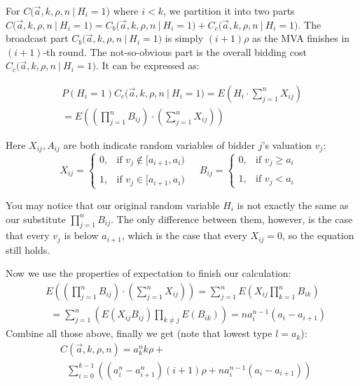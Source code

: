 For $C\big(\vec a, k, \rho, n ~\big|~ H_i = 1\big)$ where $i < k$, we partition
it into two parts $C\big(\vec a, k, \rho, n ~\big|~ H_i = 1\big) = C_b\big(\vec
a, k, \rho, n ~\big|~ H_i = 1\big) + C_c\big(\vec a, k, \rho, n ~\big|~ H_i =
1\big)$. The broadcast part $C_b\big(\vec a, k, \rho, n ~\big|~ H_i = 1 \big)$
is simply $(i+1)\rho$ as the MVA finishes in $(i+1)$-th round. The
not-so-obvious part is the overall bidding cost $C_c\big(\vec a, k, \rho, n
~\big|~ H_i = 1 \big)$. It can be expressed as:

\begin{align*}
P(H_i = 1)C_c\big(\vec a, k, \rho, n ~\big|~ H_i = 1 \big) = E\left( H_i \cdot
    \sum_{j=1}^n X_{ij}\right) \\
= E\left( \left( \prod_{j=1}^n B_{ij} \right) \cdot \left(\sum_{j=1}^n X_{ij}
    \right) \right)
\end{align*}

Here $X_{ij}, A_{ij}$ are both indicate random variables of bidder $j$'s valuation $v_j$:
$$
X_{ij} = \begin{cases}
    0, &\mbox{if $v_j \notin [a_{i+1}, a_{i})$ } \\\\
    1, &\mbox{if $v_j \in [a_{i+1}, a_{i})$}
\end{cases}
~~
B_{ij} = \begin{cases}
    0, &\mbox{if $v_j \geq a_{i}$ } \\\\
    1, &\mbox{if $v_j < a_{i}$}
\end{cases}
$$

You may notice that our original random variable $H_i$ is not exactly the same
as our substitute $\prod_{j=1}^n B_{ij}$. The only difference between them,
however, is the case that every $v_j$ is below $a_{i+1}$, which is the case
that every $X_{ij} = 0$, so the equation still holds.

Now we use the properties of expectation to finish our calculation:
\begin{align*}
  &E\left( \left( \prod_{j=1}^n B_{ij} \right) \cdot \left(\sum_{j=1}^n X_{ij}
  \right) \right) = \sum_{j=1}^n E\left( X_{ij} \prod_{k=1}^nB_{ik} \right)
  \\
    &~~ = \sum_{j=1}^n \left( E(X_{ij} B_{ij}) \prod_{k \neq j} E(B_{ik})
    \right)
       = n a_{i}^{n-1} (a_{i}-a_{i+1})
\end{align*}
Combine all those above, finally we get (note that lowest type $l = a_k$):
\begin{align}
& C(\vec a, k, \rho, n) = a_k^n k \rho + \nonumber\\ 
    &~~~ \sum_{i=0}^{k-1} \left( (a_{i}^n-a_{i+1}^n) (i+1)
    \rho + n a_{i}^{n-1} (a_{i}-a_{i+1}) \right)
\end{align}

